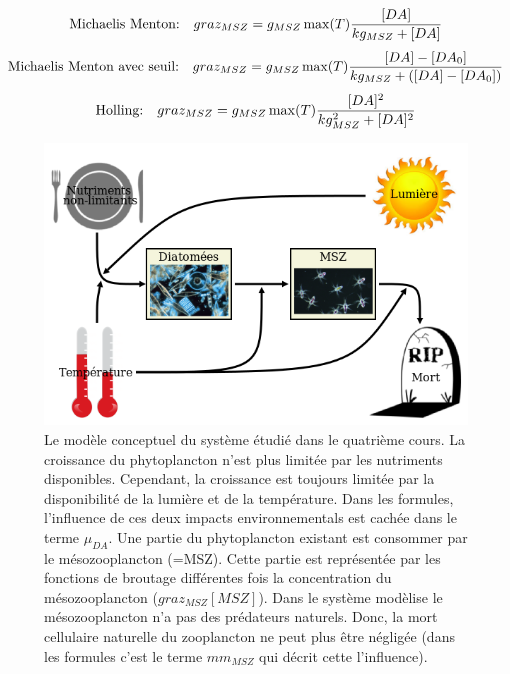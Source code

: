 {\begin{equation}
  \text{Michaelis Menton:~~~}
  graz_{MSZ} = g_{MSZ} \max(T) {{[DA]}\over{kg_{MSZ}+[DA]}}
  \label{eq:partie1GrazMic}
\end{equation}
\begin{equation}
  \text{Michaelis Menton avec seuil:~~~}
  graz_{MSZ} = g_{MSZ} \max(T) {{[DA]-[DA_0]}\over{kg_{MSZ}+([DA]-[DA_0])}}
  \label{eq:partie1GrazMicSeul}
\end{equation}
\begin{equation}
  \text{Holling:~~~}
  graz_{MSZ} = g_{MSZ} \max(T) {{[DA]^2}\over{kg_{MSZ}^2+[DA]^2}}
  \label{eq:partie1GrazHol}
\end{equation}

\begin{figure}[h!]
  \includegraphics[width=\textwidth]{partie1/diagrammeConceptuel.png}
  \caption{Le modèle conceptuel du système étudié dans le quatrième cours. La croissance du phytoplancton
n'est plus limitée par les nutriments disponibles. Cependant, la croissance est toujours limitée par la
disponibilité de la lumière et de la température. Dans les formules, l'influence de ces deux impacts
environnementals est cachée dans le terme $\mu_{DA}$. Une partie du phytoplancton existant est consommer
par le mésozooplancton (=MSZ). Cette partie est représentée par les fonctions de broutage
différentes fois la concentration du mésozooplancton ($graz_{MSZ}[MSZ]$). Dans le système modèlise
le mésozooplancton n'a pas des prédateurs naturels. Donc, la mort cellulaire naturelle du zooplancton ne peut
plus être négligée (dans les formules c'est le terme $mm_{MSZ}$ qui décrit cette l'influence).
}
  \label{fig:partie1DiagConcept}
\end{figure}

}
